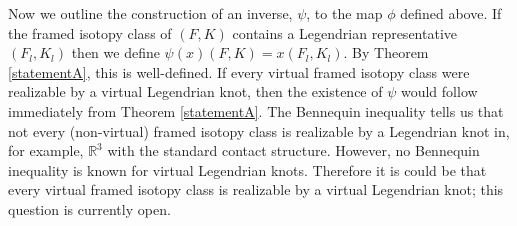 Now we outline the construction of an inverse, $\psi$, to the map $\phi$ defined above.  If the framed isotopy class of $(F,K)$ contains a Legendrian representative $(F_l,K_l)$ then we define $\psi(x)(F,K)=x(F_l,K_l)$.  By Theorem \ref{statementA}, this is well-defined. If every virtual framed isotopy class were realizable by a virtual Legendrian knot, then the existence of $\psi$ would follow immediately from Theorem \ref{statementA}.  The Bennequin inequality tells us that not every (non-virtual) framed isotopy class is realizable by a Legendrian knot in, for example, $\mathbb{R}^3$ with the standard contact structure.  However, no Bennequin inequality is known for virtual Legendrian knots.  Therefore it is could be that every virtual framed isotopy class is realizable by a virtual Legendrian knot; this question is currently open.






% 


